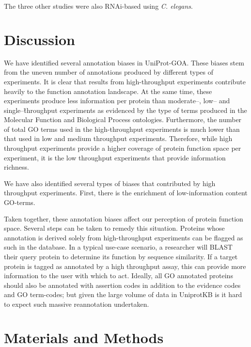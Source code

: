 \documentclass[10pt]{article}
\begin{document}
The three other studies were also RNAi-based using \textit{C. elegans}. 


\section*{Discussion}

We have identified several annotation biases in UniProt-GOA. These biases stem from the uneven number of
annotations produced by different types of experiments. It is clear that results from high-throughput experiments
contribute heavily to the function annotation landscape. At the same time, these experiments produce less
information per protein than moderate--, low-- and single--\~throughput experiments as evidenced by the type of
terms produced in the Molecular Function and Biological Process ontologies. Furthermore, the number of total GO
terms used in the high-throughput experiments is much lower than that used in low and medium throughput
experiments. Therefore, while high throughput experiments provide a higher coverage of protein
function space per experiment, it is the low throughput experiments that provide information richness. 

We have also identified several types of biases that contributed by high throughput experiments. First, there is
the enrichment of low-information content GO-terms. 

Taken together, these annotation biases affect our perception of protein function space. Several steps can be taken
to remedy this situation. Proteins whose annotation is derived solely from high-throughput experiments can be flagged
as such in the database. In a typical use-case scenario, a researcher will BLAST their query protein to determine
its function by sequence similarity. If a target protein is tagged as annotated by a high throughput
assay, this can provide more information to the user with which to act. Ideally, all GO annotated proteins should
also be annotated with assertion codes in addition to the evidence codes and GO term-codes; but given the large
volume of data in UniprotKB is it hard to expect such massive reannotation undertaken.





\section*{Materials and Methods}
\end{document}
